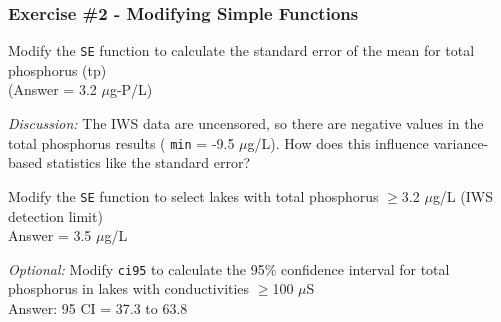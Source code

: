 \documentclass[10pt]{beamer}
\begin{document}
\begin{frame}[fragile]
\frametitle{Exercise \#2 - Modifying Simple Functions}
\bi
\item Modify the {\color{red} \tt SE} function to calculate the standard error of
  the mean for total phosphorus (tp)\\
  (Answer = 3.2 $\mu$g-P/L)

{\scriptsize
{\em Discussion:} The IWS data are uncensored, so there are
negative values in the total phosphorus results ({\color{red} \tt min}
= -9.5 $\mu$g/L).  How does this influence variance-based statistics
like the standard error?\\}

\item Modify the {\color{red} \tt SE} function to select 
  lakes with total phosphorus $\ge$3.2 $\mu$g/L (IWS detection limit)\\
Answer = 3.5 $\mu$g/L

\item {\em Optional:} Modify {\color{red} \tt ci95} to calculate the
  95\% confidence interval for total phosphorus in lakes with
  conductivities $\ge$100 $\mu$S\\ Answer: 95 CI = 37.3 to 63.8

\ei
\end{frame}
\end{document}
